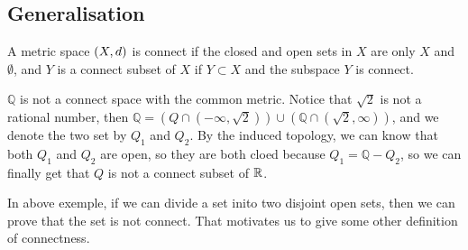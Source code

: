 \documentclass[en,hazy,blue,noraml,12pt]{elegantnote}
\begin{document}
\subsection{Generalisation}
\begin{definition}
    A metric space \((X,d)\) is connect if the closed and open sets in \(X\) are only \(X\) and \(\emptyset\), and \(Y\) is a connect subset of \(X\) if \(Y \subset X\) and the subspace \(Y\) is connect.

    \begin{example}
        \(\mathbb{Q}\) is not a connect space with the common metric. Notice that \(\sqrt{2}\) is not a rational number, then \(\mathbb{Q} = (Q \cap (-\infty,\sqrt{2})) \cup (\mathbb{Q} \cap (\sqrt{2},\infty))\), and we denote the two set by \(Q_1\) and \(Q_2\). By the induced topology, we can know that both \(Q_1\) and \(Q_2\) are open, so they are both cloed because \(Q_1 = \mathbb{Q}-Q_2\), so we can finally get that \(Q\) is not a connect subset of \(\mathbb{R}\).
    \end{example}
\end{definition}

In above exemple, if we can divide a set inito two disjoint open sets, then we can prove that the set is not connect. That motivates us to give some other definition of connectness.
\end{document}
